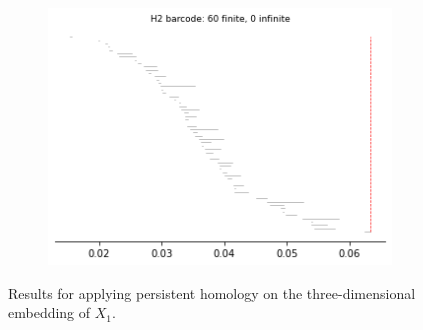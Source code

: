 \begin{figure}[H]
\begin{subfigure}[b]{0.24\textwidth}
\includegraphics[width=\textwidth]{figures/X1_H2_barcode.png}
\captionsetup{labelformat=empty}
    \caption{}
\end{subfigure}
\caption{Results for applying persistent homology on the three-dimensional embedding of $X_1$.}
\end{figure}

